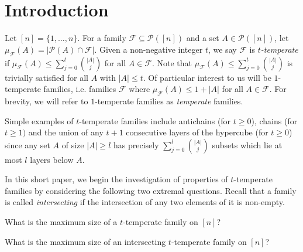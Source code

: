 
\newcommand{\fly}[0]{\mathcal{F}}
\newcommand{\pot}[1]{\mathcal{P}(#1)}
\newcommand{\muf}[0]{\mu_{\fly}}
\newcommand{\muft}[0]{\mu_{\widetilde{\fly}}}
\newcommand{\saw}[0]{temperate }
\newcommand{\sawt}[1]{$#1$-temperate}
\newcommand{\jan}[1]{\textcolor{orange}{\textbf{#1}}}
\newcommand{\pavel}[1]{\textcolor{blue}{\textbf{#1}}}

\section{Introduction}

Let $[n]=\{1,\ldots,n\}$. For a family $\fly \subseteq \pot{[n]}$ and a set $A \in \pot{[n]}$, let $\muf(A)=|\pot{A} \cap \fly|$.
Given a non-negative integer $t$, we say $\fly$ is \textit{\sawt{t}} if $\muf(A) \leq \sum_{j=0}^t \binom{|A|}{j}$ for all $A \in \fly$. Note that $\muf(A) \leq \sum_{j=0}^t \binom{|A|}{j}$ is trivially satisfied for all $A$ with $|A|\leq t$.
Of particular interest to us will be \sawt{1} families, i.e. families $\fly$ where $\muf(A) \leq 1+|A|$ for all $A \in \fly$.
For brevity, we will refer to \sawt{1} families as \textit{\saw}families. 

Simple examples of \sawt{t} families include antichains (for $t\geq0$), chains (for $t \geq 1)$ and the union of any $t+1$ consecutive layers of the hypercube (for $t \geq 0$) since any set $A$ of size $|A| \geq l$ has precisely $\sum_{j=0}^l \binom{|A|}{j}$ subsets which lie at most $l$ layers below $A$.

In this short paper, we begin the investigation of properties of \sawt{t} families by considering the following two extremal questions. Recall that a family is called \emph{intersecting} if the intersection of any two elements of it is non-empty.

\begin{question} \label{qu:nintersecting}
What is the maximum size of a \sawt{t} family on $[n]$?
\end{question}

\begin{question} \label{qu:intersecting}
What is the maximum size of an intersecting \sawt{t} family on $[n]$?
\end{question}

